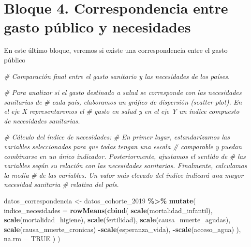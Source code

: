 \documentclass[,article,,moreauthors,pdftex]{Definitions/mdpi}
\newenvironment{Shaded}{\begin{snugshade}}{\end{snugshade}}
\newcommand{\AttributeTok}[1]{\textcolor[rgb]{0.13,0.29,0.53}{#1}}
\newcommand{\CommentTok}[1]{\textcolor[rgb]{0.56,0.35,0.01}{\textit{#1}}}
\newcommand{\ConstantTok}[1]{\textcolor[rgb]{0.56,0.35,0.01}{#1}}
\newcommand{\FunctionTok}[1]{\textcolor[rgb]{0.13,0.29,0.53}{\textbf{#1}}}
\newcommand{\NormalTok}[1]{#1}
\newcommand{\OtherTok}[1]{\textcolor[rgb]{0.56,0.35,0.01}{#1}}
\newcommand{\SpecialCharTok}[1]{\textcolor[rgb]{0.81,0.36,0.00}{\textbf{#1}}}
\begin{document}
\section{Bloque 4. Correspondencia entre gasto público y
necesidades}\label{bloque-4.-correspondencia-entre-gasto-puxfablico-y-necesidades}

En este último bloque, veremos si existe una correspondencia entre el
gasto público

\begin{Shaded}
\begin{Highlighting}[]
\CommentTok{\# Comparación final entre el gasto sanitario y las necesidades de los países.}

\CommentTok{\# Para analizar si el gasto destinado a salud se corresponde con las necesidades sanitarias de}
\CommentTok{\# cada país, elaboramos un gráfico de dispersión (scatter plot). En el eje X representaremos el}
\CommentTok{\# gasto en salud y en el eje Y un índice compuesto de necesidades sanitarias.}

\CommentTok{\# Cálculo del índice de necesidades:}
\CommentTok{\# En primer lugar, estandarizamos las variables seleccionadas para que todas tengan una escala}
\CommentTok{\# comparable y puedan combinarse en un único indicador. Posteriormente, ajustamos el sentido de}
\CommentTok{\# las variables según su relación con las necesidades sanitarias. Finalmente, calculamos la media}
\CommentTok{\# de las variables. Un valor más elevado del índice indicará una mayor necesidad sanitaria}
\CommentTok{\# relativa del país.}

\NormalTok{datos\_correspondencia }\OtherTok{\textless{}{-}}\NormalTok{ datos\_cohorte\_2019 }\SpecialCharTok{\%\textgreater{}\%}
 \FunctionTok{mutate}\NormalTok{(}
   \AttributeTok{indice\_necesidades =} \FunctionTok{rowMeans}\NormalTok{(}\FunctionTok{cbind}\NormalTok{(}
       \FunctionTok{scale}\NormalTok{(mortalidad\_infantil),}
       \FunctionTok{scale}\NormalTok{(mortalidad\_higiene),}
       \FunctionTok{scale}\NormalTok{(fertilidad),}
       \FunctionTok{scale}\NormalTok{(causa\_muerte\_agudas),}
       \FunctionTok{scale}\NormalTok{(causa\_muerte\_cronicas)}
       \SpecialCharTok{{-}}\FunctionTok{scale}\NormalTok{(esperanza\_vida),}
       \SpecialCharTok{{-}}\FunctionTok{scale}\NormalTok{(acceso\_agua)}
\NormalTok{     ),}
     \AttributeTok{na.rm =} \ConstantTok{TRUE}
\NormalTok{   )}
\NormalTok{ )}


\end{Highlighting}
\end{Shaded}
\end{document}
